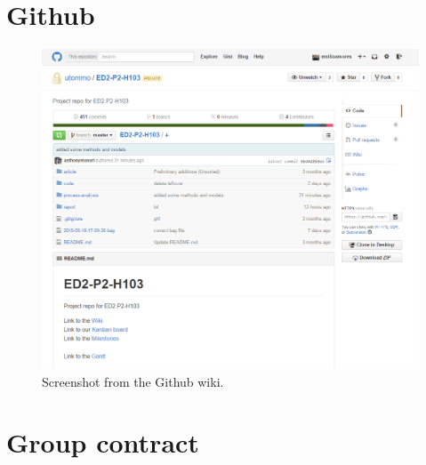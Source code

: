 \clearpage
\section{Github}\label{appendix:github}

\begin{figure}[H]
	\centering
	\includegraphics[width=1\linewidth]{images/github.png}
	\caption{Screenshot from the Github wiki.}
	\label{fig:github}
\end{figure}

\clearpage
\section{Group contract}\label{appendix:group-contract}


